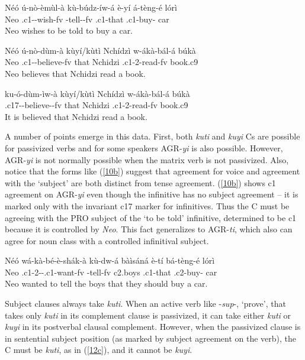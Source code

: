 \documentclass[output=paper,
modfonts
]{langscibook}
\begin{document}
\ex \label{10b} \gll Néó  ú-nò-èmùl-à kù-búdz-íw-á è-yí	 á-tèng-é lórì\\
	Neo	.c1--wish-fv	-tell--fv  .c1-that .c1-buy-	car\\
	\glt Neo wishes to be told to buy a car.

\ex \label{10c} \gll Néó ú-nò-dùm-à kùyí/kùtì Nchídzì  w-ákà-bál-á búkà\\
	Neo	 .c1--believe-fv that Nchidzi   .c1-2-read-fv book.c9\\
	\glt Neo believes that Nchidzi read a book.

\ex \label{10d} \gll ku-ó-dùm-ìw-à kùyí/kùtì  Nchídzì	w-ákà-bál-á búkà\\
	.c17--believe--fv that Nchidzi	.c1-2-read-fv book.c9\\
	\glt It is believed that Nchidzi read a book.\footnotemark
    \z\z
{} 

A number of points emerge in this data. First, both \textit{kuti} and \textit{kuyi} Cs are possible for passivized verbs and for some speakers AGR-\textit{yi} is also possible. However, AGR-\textit{yi} is not normally possible when the matrix verb is not passivized. Also, notice that the forms like (\ref{10b}) suggest that agreement for voice and agreement with the `subject' are both distinct from tense agreement. (\ref{10b}) shows c1 agreement on AGR-\textit{yi} even though the infinitive has no subject agreement – it is marked only with the invariant c17 marker for infinitives. Thus the C must be agreeing with the PRO subject of the `to be told' infinitive, determined to be c1 because it is controlled by \textit{Neo}. This fact generalizes to AGR-\textit{ti}, which also can agree for noun class with a controlled infinitival subject. 

\ea \label{11} \gll	Néó	wá-kà-bé-è-shák-à kù-dw-á bàìsáná  è-tí bá-tèng-é 		lórì\\
	Neo	.c1-2--.c1-want-fv -tell-fv c2.boys .c1-that
    .c2-buy-	car\\
    \glt Neo wanted to tell the boys that they should buy a car.\z

Subject clauses always take \textit{kuti}. When an active verb like -\textit{sup}-, `prove',  that takes only \textit{kuti} in its complement clause is passivized, it can take either \textit{kuti} or \textit{kuyi} in its postverbal clausal complement. However, when the passivized clause is in sentential subject position (as marked by subject agreement on the verb), the C must be \textit{kuti}, as in (\ref{12c}), and it cannot be \textit{kuyi}.
\end{document}
